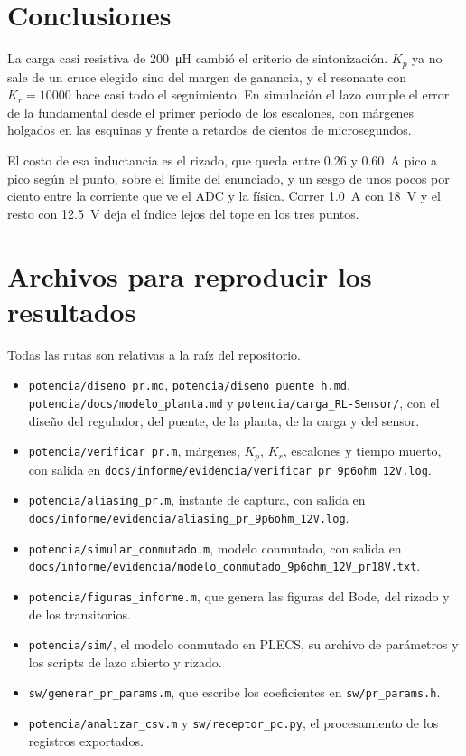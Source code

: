 \documentclass[journal]{IEEEtran}
\begin{document}
\section{Conclusiones}
\label{sec:conclusiones}
La carga casi resistiva de \SI{200}{\micro H} cambió el criterio de sintonización. $K_p$ ya no sale de un cruce elegido sino del margen de ganancia, y el resonante con $K_r=\num{10000}$ hace casi todo el seguimiento. En simulación el lazo cumple el error de la fundamental desde el primer período de los escalones, con márgenes holgados en las esquinas y frente a retardos de cientos de microsegundos.

El costo de esa inductancia es el rizado, que queda entre \num{0.26} y \SI{0.60}{A} pico a pico según el punto, sobre el límite del enunciado, y un sesgo de unos pocos por ciento entre la corriente que ve el ADC y la física. Correr \SI{1.0}{A} con \SI{18}{V} y el resto con \SI{12.5}{V} deja el índice lejos del tope en los tres puntos.

\appendix
\section{Archivos para reproducir los resultados}
\label{app:archivos}
Todas las rutas son relativas a la raíz del repositorio.

\begin{itemize}
	\item \texttt{potencia/diseno\_pr.md}, \texttt{potencia/diseno\_puente\_h.md}, \texttt{potencia/docs/modelo\_planta.md} y \texttt{potencia/carga\_RL-Sensor/}, con el diseño del regulador, del puente, de la planta, de la carga y del sensor.
	\item \texttt{potencia/verificar\_pr.m}, márgenes, $K_p$, $K_r$, escalones y tiempo muerto, con salida en \texttt{docs/\allowbreak informe/\allowbreak evidencia/\allowbreak verificar\_pr\_9p6ohm\_12V.log}.
	\item \texttt{potencia/aliasing\_pr.m}, instante de captura, con salida en \texttt{docs/\allowbreak informe/\allowbreak evidencia/\allowbreak aliasing\_pr\_9p6ohm\_12V.log}.
	\item \texttt{potencia/simular\_conmutado.m}, modelo conmutado, con salida en \texttt{docs/\allowbreak informe/\allowbreak evidencia/\allowbreak modelo\_conmutado\_\allowbreak 9p6ohm\_12V\_pr18V.txt}.
	\item \texttt{potencia/figuras\_informe.m}, que genera las figuras del Bode, del rizado y de los transitorios.
	\item \texttt{potencia/sim/}, el modelo conmutado en PLECS, su archivo de parámetros y los scripts de lazo abierto y rizado.
	\item \texttt{sw/generar\_pr\_params.m}, que escribe los coeficientes en \texttt{sw/pr\_params.h}.
	\item \texttt{potencia/analizar\_csv.m} y \texttt{sw/receptor\_pc.py}, el procesamiento de los registros exportados.
\end{itemize}
\end{document}
